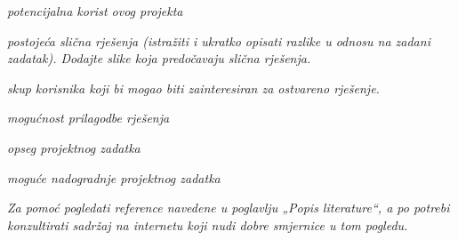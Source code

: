 	
		
		\begin{packed_item}
			\item \textit{potencijalna korist ovog projekta}
			\item \textit{postojeća slična rješenja (istražiti i ukratko opisati razlike u odnosu na zadani zadatak). Dodajte slike koja predočavaju slična rješenja.}
			\item \textit{skup korisnika koji bi mogao biti zainteresiran za ostvareno rješenje.}
			\item \textit{mogućnost prilagodbe rješenja }
			\item \textit{opseg projektnog zadatka}
			\item \textit{moguće nadogradnje projektnog zadatka}
		\end{packed_item}
		
		\textit{Za pomoć pogledati reference navedene u poglavlju „Popis literature“, a po potrebi konzultirati sadržaj na internetu koji nudi dobre smjernice u tom pogledu.}
		\eject
		
				
	